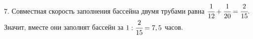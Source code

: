 7. Совместная скорость заполнения бассейна двумя трубами равна $\cfrac{1}{12}+\cfrac{1}{20}=\cfrac{2}{15}.$ Значит, вместе они заполнят бассейн за $1:\cfrac{2}{15}=7,5$ часов.\\
